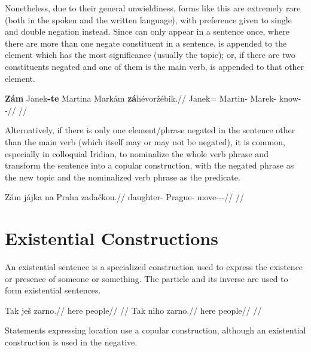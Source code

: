 Nonetheless, due to their general unwieldiness, forms like this are extremely
rare (both in the spoken and the written language), with preference given to
single and double negation instead. Since  can only appear in a
sentence once, where there are more than one negate constituent in a sentence,
 is appended to the element which has the most significance (usually
the topic); or, if there are two constituents negated and one of them is the
main verb,  is appended to that other element.

\pex
\begingl
    \gla \textbf{Zám} Janek\textbf{-te} Martina Markám \textbf{zá}hévoržébik.//
    \glb \Neg{} Janek=\Foc{} Martin-\Pat{} Marek-\Agt{} \Neg{}know-\Ben{}-\Pf{}//
    \glft {}//
\endgl
\xe

Alternatively, if there is only one element/phrase negated in the sentence other than the main verb (which itself may or may not be negated), it is common, especially in colloquial Iridian, to nominalize the whole verb phrase and transform the sentence into a copular construction, with the negated phrase as the new topic and the nominalized verb phrase as the predicate.

\pex
\begingl
    \gla Z\'am j\'ajka na Praha zada\v{c}kou.//
    \glb \Neg{} daughter-\Dim{} \Loc{} Prague-\Pat{} move-\Av{}-\Pf{}-\Nz{}//
    \glft {}//
\endgl
\xe



\section{Existential Constructions}
\label{sec:exst}
An existential sentence is a specialized construction used to express the existence or presence of someone or something. The particle  and its inverse  are used to form existential sentences.

\begin{multicols}{2}
\pex
\begingl
\gla Tak ješ zarno.//
\glb here \Exst{} people//
\glft {}//
\endgl
\xe
\pex
\begingl
\gla Tak niho zarno.//
\glb here \N{}\Exst{} people//
\glft {}//
\endgl
\xe
\end{multicols}

Statements expressing location use a copular construction, although an existential construction is used in the negative.

